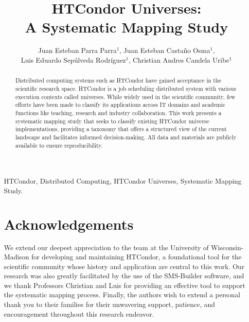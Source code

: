 \documentclass[10pt]{cys}
\title{HTCondor Universes:\\ A Systematic Mapping Study}
\author{Juan Esteban Parra Parra$^1$\orcidlink{0009-0007-4518-1086}, Juan Esteban Castaño Osma$^1$\orcidlink{0009-0006-0402-4351},\\
Luis Eduardo Sepúlveda Rodríguez$^1$\orcidlink{0000-0003-2446-0602}, Christian Andres Candela Uribe$^1$\orcidlink{0000-0002-3961-1840}}
\affil{ 
$^1$ University of Quindío, Engineering Faculty, Armenia, \authorcr   %
Colombia             
\authorcr \authorcr
juane.parrap@uqvirtual.edu.co, juane.castanoo@uqvirtual.edu.co,\\
lesepulveda@uniquindio.edu.co, cacandela@uniquindio.edu.co
\authorcr  \authorcr
}
\begin{document}
\maketitle
{}

\renewcommand{\tablename}{Table}

\begin{abstract}
Distributed computing systems such as HTCondor have gained acceptance in the scientific research space. HTCondor is a job scheduling distributed system with various execution contexts called universes. While widely used in the scientific community, few efforts have been made to classify its applications across IT domains and academic functions like teaching, research and industry collaboration. This work presents a systematic mapping study that seeks to classify existing HTCondor universe implementations, providing a taxonomy that offers a structured view of the current landscape and facilitates informed decision-making. All data and materials are publicly available to ensure reproducibility.
\end{abstract}

\begin{keywords} 
HTCondor, Distributed Computing, HTCondor Universes, Systematic Mapping Study.
\end{keywords} 

















\section*{Acknowledgements} 
We extend our deepest appreciation to the team at the University of Wisconsin-Madison for developing and maintaining HTCondor, a foundational tool for the scientific community whose history and application are central to this work. Our research was also greatly facilitated by the use of the SMS-Builder software, and we thank Professors Christian and Luis for providing an effective tool to support the systematic mapping process.
Finally, the authors wish to extend a personal thank you to their families for their unwavering support, patience, and encouragement throughout this research endeavor.
\end{document}
